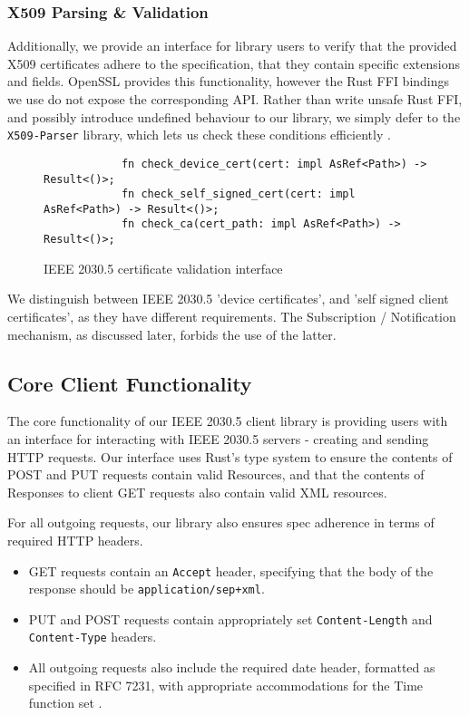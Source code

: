 \subsubsection{X509 Parsing \& Validation}
Additionally, we provide an interface for library users to verify that the provided X509 certificates adhere to the specification, that they contain specific extensions and fields. OpenSSL provides this functionality, however the Rust FFI bindings we use do not expose the corresponding API. Rather than write unsafe Rust FFI, and possibly introduce undefined behaviour to our library, we simply defer to the \texttt{X509-Parser} library, which lets us check these conditions efficiently \cite{x509parser}.

\begin{figure}[h]
    \begin{center}
        \begin{lstlisting}
            fn check_device_cert(cert: impl AsRef<Path>) -> Result<()>;
            fn check_self_signed_cert(cert: impl AsRef<Path>) -> Result<()>;
            fn check_ca(cert_path: impl AsRef<Path>) -> Result<()>;
        \end{lstlisting}
        \label{fig:certvalidinterface}
        \vspace{-10pt}
        \caption{IEEE 2030.5 certificate validation interface}
    \end{center}
\end{figure}

We distinguish between IEEE 2030.5 'device certificates', and 'self signed client certificates', as they have different requirements. The Subscription / Notification mechanism, as discussed later, forbids the use of the latter.

\subsection{Core Client Functionality}
The core functionality of our IEEE 2030.5 client library is providing users with an interface for interacting with IEEE 2030.5 servers - creating and sending HTTP requests.
Our interface uses Rust's type system to ensure the contents of POST and PUT requests contain valid Resources, and that the contents of Responses to client GET requests also contain valid XML resources.

For all outgoing requests, our library also ensures spec adherence in terms of required HTTP headers. 

\begin{itemize}
    \item GET requests contain an \texttt{Accept} header, specifying that the body of the response should be \texttt{application/sep+xml}.
    \item PUT and POST requests contain appropriately set \texttt{Content-Length} and \texttt{Content-Type} headers.
    \item All outgoing requests also include the required date header, formatted as specified in RFC 7231, with appropriate accommodations for the Time function set  \cite{rfc7231}.
\end{itemize}


